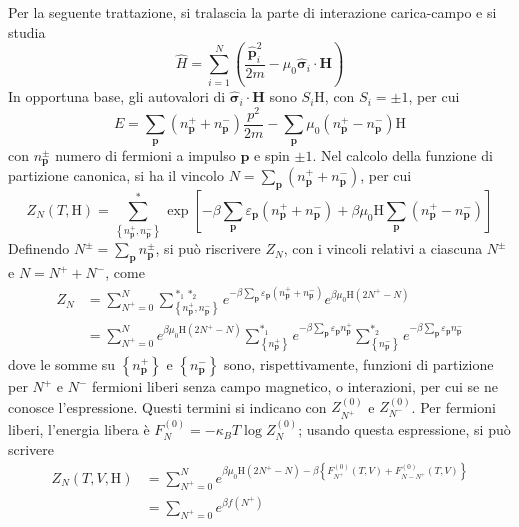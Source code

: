\documentclass[11pt, a4paper]{scrartcl}
\theoremstyle{style}
\theoremstyle{style1}
\numberwithin{equation}{subsection}
\begin{document}
Per la seguente trattazione, si tralascia la parte di interazione carica-campo e si studia
\[
\hat{H} = \sum_{i=1}^{N} \left(\frac{\hat{\mathbf{p} }_i ^2}{2m} - \mu _0 \hat{\pmb{\sigma } }_i \cdot \mathbf{H} \right) 
\] 
In opportuna base, gli autovalori di $\hat{\pmb{\sigma } }_i \cdot \mathbf{H} $ sono $S_i\mathrm{H} $, con $S_i = \pm 1$, per cui
\[
E = \sum_{\mathbf{p} }^{} \left(n^+_\mathbf{p} + n^-_\mathbf{p} \right) \frac{p^2}{2m} - \sum_{\mathbf{p} }^{}\mu _0 \left(n^+_\mathbf{p} - n ^- _\mathbf{p} \right) \mathrm{H} 
\] 
con $n^\pm_\mathbf{p} $ numero di fermioni a impulso $\mathbf{p} $ e spin $\pm 1$.
Nel calcolo della funzione di partizione canonica, si ha il vincolo $N = \sum_{\mathbf{p} }^{} \left(n^+_\mathbf{p}  + n_\mathbf{p} ^-\right) $, per cui
\[
	Z_N(T,\mathrm{H} ) = \sum_{\left\{ n^+_\mathbf{p} ,n^-_\mathbf{p}  \right\} }^{*} \exp \left[ - \beta \sum_{\mathbf{p} }^{} \varepsilon _\mathbf{p} \left(n^+_\mathbf{p} +n^-_\mathbf{p} \right) + \beta \mu _0 \mathrm{H} \sum_{\mathbf{p} }^{}\left(n_\mathbf{p} ^+ - n^-_\mathbf{p} \right)  \right]
\] 
Definendo $N^\pm = \sum_{\mathbf{p} }^{} n^\pm_\mathbf{p} $, si pu\`o riscrivere $Z_N$, con i vincoli relativi a ciascuna $N^\pm$ e $N = N^+ + N^-$, come
\[
	\begin{split}
		Z_N &= \sum_{N^+=0}^{N} \sum_{\left\{ n^+_\mathbf{p} , n^-_\mathbf{p}  \right\} }^{*_1 *_2} e^{-\beta \sum_{\mathbf{p} }^{} \varepsilon _\mathbf{p} \left(n^+_\mathbf{p}  + n^-_\mathbf{p} \right) }e^{\beta \mu _0 \mathrm{H} (2N^+ - N)}\\
		    &= \sum_{N^+ = 0}^{N} e^{\beta \mu _0\mathrm{H} (2N^+ - N)} \sum_{\left\{ n^+_\mathbf{p}  \right\} }^{*_1} e^{-\beta \sum_{\mathbf{p} }^{} \varepsilon _\mathbf{p} n^+_\mathbf{p} } \sum_{\left\{ n_\mathbf{p} ^- \right\} }^{*_2} e^{-\beta \sum_{\mathbf{p} }^{} \varepsilon _\mathbf{p} n^-_\mathbf{p} }
	\end{split}
\] 
dove le somme su $\left\{ n_\mathbf{p} ^+ \right\} $ e $\left\{ n_\mathbf{p} ^- \right\} $ sono, rispettivamente, funzioni di partizione per $N^+$ e $N^-$ fermioni liberi senza campo magnetico, o interazioni, per cui se ne conosce l'espressione.
Questi termini si indicano con $Z_{N^+} ^{(0)}$ e $Z_{N^-} ^{(0)}$.
Per fermioni liberi, l'energia libera \`e $F_N^{(0)} = - \kappa _B T \log Z_N^{(0)} $; usando questa espressione, si pu\`o scrivere
\[
	\begin{split}
		Z_N(T,V,\mathrm{H} ) &= \sum_{N^+ = 0}^{N} e^{\beta \mu _0 \mathrm{H}  (2N^+ - N) - \beta \left\{ F_{N^+} ^{(0)} (T,V) + F_{N-N^+} ^{(0)}(T,V) \right\} }\\
				     & = \sum_{N^+ = 0}^{} e^{\beta f (N^+)}
	\end{split}
\] 
\end{document}
